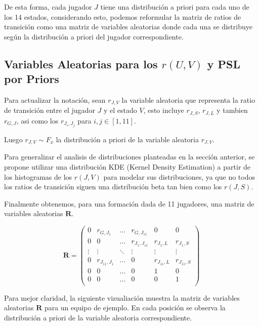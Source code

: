 \documentclass[
  a4paper,
]{article}
\begin{document}
De esta forma, cada jugador \(J\) tiene una distribución a priori para
cada uno de los 14 estados, considerando esto, podemos reformular la
matriz de ratios de transición como una matriz de variables aleatorias
donde cada una se distribuye según la distribución a priori del jugador
correspondiente.

\hypertarget{variables-aleatorias-para-los-ru-v-y-psl-por-priors}{%
\subsection{\texorpdfstring{Variables Aleatorias para los \(r(U, V)\) y
PSL por
Priors}{Variables Aleatorias para los r(U, V) y PSL por Priors}}\label{variables-aleatorias-para-los-ru-v-y-psl-por-priors}}

Para actualizar la notación, sean \(r_{J, V}\) la variable aleatoria que
representa la ratio de transición entre el jugador \(J\) y el estado
\(V\), esto incluye \(r_{J, S}\), \(r_{J, L}\) y tambien \(r_{G, J}\),
asi como los \(r_{J_i, J_j}\) para \(i, j \in [1, 11]\).

Luego \(r_{J, V} \sim F_x\) la distribución a priori de la variable
aleatoria \(r_{J, V}\).

Para generalizar el analisis de distribuciones planteadas en la sección
anterior, se propone utilizar una distribución KDE (Kernel Density
Estimation) a partir de los histogramas de los \(r(J, V)\) para modelar
sus distribuciones, ya que no todos los ratios de transición siguen una
distribución beta tan bien como los \(r(J, S)\).

Finalmente obtenemos, para una formación dada de 11 jugadores, una
matriz de variables aleatorias \(\mathbf{R}\).

\[
    \mathbf{R} = \begin{pmatrix}
        0 & r_{G, J_1} & \dots & r_{G, J_{11}} & 0 & 0 \\
        0 & 0 & \dots & r_{J_1, J_{11}} & r_{J_1, L} & r_{J_1, S} \\
        \vdots & \vdots & \ddots & \vdots & \vdots & \vdots \\
        0 & r_{J_{11}, J_1} & \dots & 0 & r_{J_{11}, L} & r_{J_{11}, S} \\
        0 & 0 & \dots & 0 & 1 & 0 \\
        0 & 0 & \dots & 0 & 0 & 1 \\
    \end{pmatrix}
\]

Para mejor claridad, la siguiente vizualiación muestra la matriz de
variables aleatorias \(\mathbf{R}\) para un equipo de ejemplo. En cada
posición se observa la distribución a priori de la variable aleatoria
correspondiente.
\end{document}
